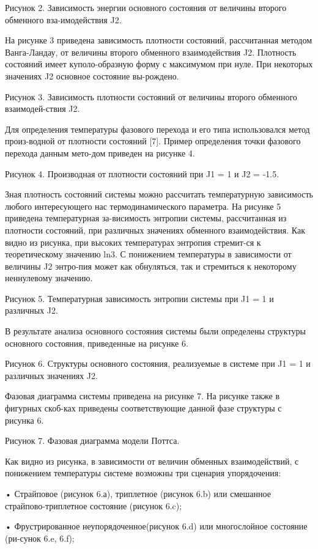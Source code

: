 Рисунок 2. Зависимость энергии основного состояния от величины второго обменного вза-имодействия J2.


На рисунке 3 приведена зависимость плотности состояний, рассчитанная методом Ванга-Ландау, от величины второго обменного взаимодействия J2. Плотность состояний имеет куполо-образную форму с максимумом при нуле. При некоторых значениях J2 основное состояние вы-рождено.


Рисунок 3. Зависимость плотности состояний от величины второго обменного взаимодей-ствия J2.


Для определения температуры фазового перехода и его типа использовался метод произ-водной от плотности состояний [7]. Пример определения точки фазового перехода данным мето-дом приведен на рисунке 4.



Рисунок 4. Производная от плотности состояний при  J1 = 1 и  J2 = -1.5.

Зная плотность состояний системы можно рассчитать температурную зависимость любого интересующего нас термодинамического параметра. На рисунке 5 приведена температурная за-висимость энтропии системы, рассчитанная из плотности состояний, при различных значениях обменного взаимодействия. Как видно из рисунка, при высоких температурах энтропия стремит-ся к теоретическому значению ln3. С понижением температуры в зависимости от величины J2 энтро-пия может как обнуляться, так и стремиться к некоторому неннулевому значению.

Рисунок 5. Температурная зависимость энтропии системы при  J1 = 1 и различных J2.

В результате анализа основного состояния системы были определены структуры основного состояния, приведенные на рисунке 6.

Рисунок 6. Структуры основного состояния, реализуемые в системе при   J1 = 1 и различных значениях  J2.


Фазовая диаграмма системы приведена на рисунке 7. На рисунке также в фигурных скоб-ках приведены соответствующие данной фазе структуры с рисунка 6.

Рисунок 7. Фазовая диаграмма модели Поттса.

Как видно из рисунка, в зависимости от величин обменных взаимодействий, с понижением температуры системе возможны три сценария упорядочения:

•	Страйповое (рисунок 6.а), триплетное (рисунок 6.b) или смешанное страйпово-триплетное состояние (рисунок 6.c);

•	Фрустрированное неупорядоченное(рисунок 6.d) или многослойное состояние (ри-сунок 6.e, 6.f);

